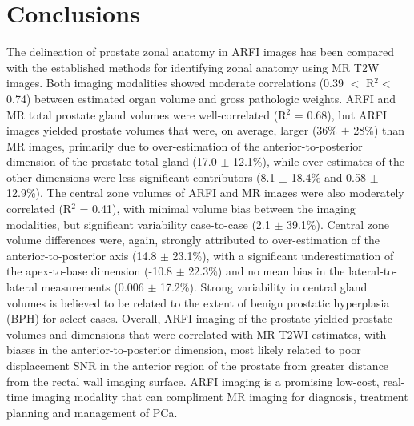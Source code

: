 \section{Conclusions}
The delineation of prostate zonal anatomy in ARFI images has been compared with
the established methods for identifying zonal anatomy using MR T2W images.
Both imaging modalities showed moderate correlations (0.39 $<$ R$^2 < $ 0.74)
between estimated organ volume and gross pathologic weights.  ARFI and MR total
prostate gland volumes were well-correlated (R$^2$ = 0.68), but ARFI images
yielded prostate volumes that were, on average, larger (36\% $\pm$ 28\%) than
MR images, primarily due to over-estimation of the anterior-to-posterior
dimension of the prostate total gland (17.0 $\pm$ 12.1\%), while over-estimates
of the other dimensions were less significant contributors (8.1 $\pm$ 18.4\%
and 0.58 $\pm$ 12.9\%).  The central zone volumes of ARFI and MR images were
also moderately correlated (R$^2$ = 0.41), with minimal volume bias between the
imaging modalities, but significant variability case-to-case (2.1 $\pm$
39.1\%).  Central zone volume differences were, again, strongly attributed to
over-estimation of the anterior-to-posterior axis (14.8 $\pm$ 23.1\%), with a
significant underestimation of the apex-to-base dimension (-10.8 $\pm$ 22.3\%)
and no mean bias in the lateral-to-lateral measurements (0.006 $\pm$ 17.2\%).
Strong variability in central gland volumes is believed to be related to the
extent of benign prostatic hyperplasia (BPH) for select cases.  Overall, ARFI
imaging of the prostate yielded prostate volumes and dimensions that were
correlated with MR T2WI estimates, with biases in the anterior-to-posterior
dimension, most likely related to poor displacement SNR in the anterior region
of the prostate from greater distance from the rectal wall imaging surface.
ARFI imaging is a promising low-cost, real-time imaging modality that can
compliment MR imaging for diagnosis, treatment planning and management of PCa.
